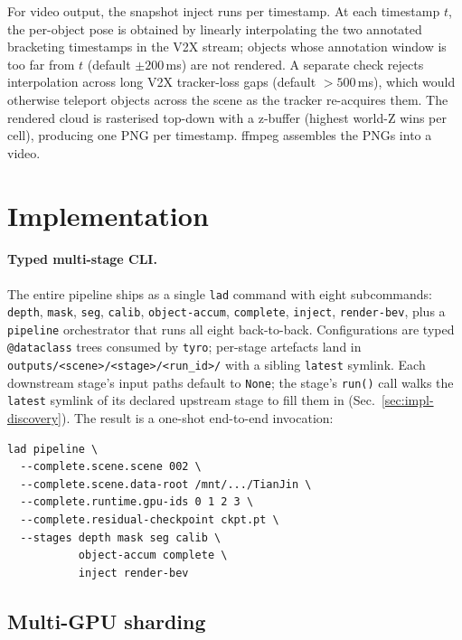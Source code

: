 \documentclass[10pt,twocolumn,letterpaper]{article}
\begin{document}
For video output, the snapshot inject runs per timestamp. At each
timestamp $t$, the per-object pose is obtained by linearly
interpolating the two annotated bracketing timestamps in the V2X
stream; objects whose annotation window is too far from $t$ (default
$\pm 200$\,ms) are not rendered. A separate check rejects
interpolation across long V2X tracker-loss gaps (default $> 500$\,ms),
which would otherwise teleport objects across the scene as the
tracker re-acquires them. The rendered cloud is rasterised top-down
with a z-buffer (highest world-Z wins per cell), producing one PNG per
timestamp. ffmpeg assembles the PNGs into a video.


\section{Implementation}
\label{sec:impl}

\paragraph{Typed multi-stage CLI.} The entire pipeline ships as a
single \texttt{lad} command with eight subcommands:
\texttt{depth}, \texttt{mask}, \texttt{seg}, \texttt{calib},
\texttt{object-accum}, \texttt{complete}, \texttt{inject},
\texttt{render-bev}, plus a \texttt{pipeline} orchestrator that runs
all eight back-to-back. Configurations are typed \texttt{@dataclass}
trees consumed by \texttt{tyro}; per-stage artefacts land in
\texttt{outputs/<scene>/<stage>/<run\_id>/} with a sibling
\texttt{latest} symlink. Each downstream stage's input paths default
to \texttt{None}; the stage's \texttt{run()} call walks the
\texttt{latest} symlink of its declared upstream stage to fill them
in (Sec.~\ref{sec:impl-discovery}). The result is a one-shot
end-to-end invocation:

\begin{small}
\begin{verbatim}
lad pipeline \
  --complete.scene.scene 002 \
  --complete.scene.data-root /mnt/.../TianJin \
  --complete.runtime.gpu-ids 0 1 2 3 \
  --complete.residual-checkpoint ckpt.pt \
  --stages depth mask seg calib \
           object-accum complete \
           inject render-bev
\end{verbatim}
\end{small}


\subsection{Multi-GPU sharding}
\label{sec:impl-multigpu}
\end{document}
